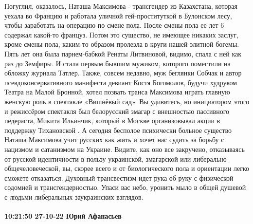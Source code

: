 Погуглил, оказалось, Наташа Максимова - трансгендер из Казахстана, которая уехала во Францию и работала уличной гей-проституткой в Булонском лесу, чтобы заработать на операцию по смене пола. После смены пола ее лет 6 содержал какой-то француз.
Потом это существо, не имеющее никаких заслуг, кроме смены пола, каким-то образом пролезла в круги нашей элитной богемы.
Пять лет она была парнем-бабкой Ренаты Литвиновой, видимо, спала с ней как раз до Земфиры. И стала первым бывшим мужиком, которого поместили на обложку журнала Татлер.
Также, совсем недавно, муж беглянки Собчак и автор псевдоконсервативного манифеста девиант Костя Богомолов, будучи худруком Театра на Малой Бронной, хотел позвать транса Максимова играть главную женскую роль в спектакле «Вишнёвый сад».
Вы удивитесь, но инициатором этого и режиссёром спектакля был белорусский змагар с внешностью пассивного педераста, Микита Ильинчик, который в Москве организовывал акции в поддержку Тихановской .
А сегодня бесполое психически больное существо Наташа Максимова учит русских как жить и хочет нас судить за борьбу с нацизмом и сатанизмом на Украине.
Видите, как оно все закручено, отказываясь от русской идентичности в пользу украинской, змагарской или либерально-общечеловеческой, вы, скорее всего и от биологического пола и ориентации легко сможете отказаться.
Духовный трансвестизм идет рука об руку с физической содомией и трансгендерностью.
Упаси вас небо, уронить мыло в общей душевой с людьми либеральных заукраинских взглядов.

\paragraph{10:21:50 27-10-22 Юрий Афанасьев}

